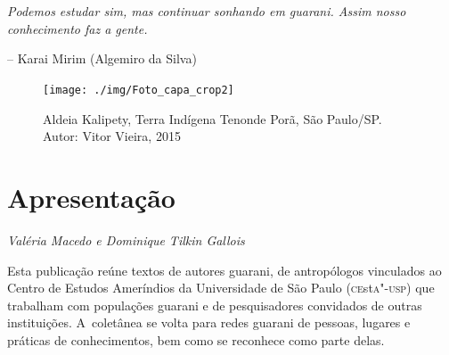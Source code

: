 \chapter*{}

\vspace*{\fill}

\epigraph{\emph{Podemos estudar sim, mas continuar sonhando em guarani. Assim nosso conhecimento faz a gente.}}{-- Karai Mirim (Algemiro da Silva)}

\thispagestyle{empty}

\pagebreak


\begin{absolutelynopagebreak}
\begin{figure}[H]
\begin{adjustwidth}{-2.7cm}{}
\vspace{-3.1cm}
  \texttt{[image: ./img/Foto\_capa\_crop2]}
\end{adjustwidth}
\caption{Aldeia Kalipety, Terra Indígena Tenonde Porã, São Paulo/SP. Autor: Vitor Vieira, 2015}
\end{figure}
\end{absolutelynopagebreak}

\vspace*{\fill}

\thispagestyle{empty}

\chapter*{Apresentação}


\begin{flushright}
\emph{Valéria Macedo e Dominique Tilkin Gallois}
\end{flushright}

\medskip
\noindent
Esta publicação reúne textos de autores guarani, de antropólogos
vinculados ao Centro de Estudos Ameríndios da Universidade de São Paulo
(\textsc{ce}st\textsc{a"-usp}) que trabalham com populações guarani e de pesquisadores
convidados de outras instituições. A~coletânea se volta para redes
guarani de pessoas, lugares e práticas de conhecimentos, bem como se
reconhece como parte delas. 

